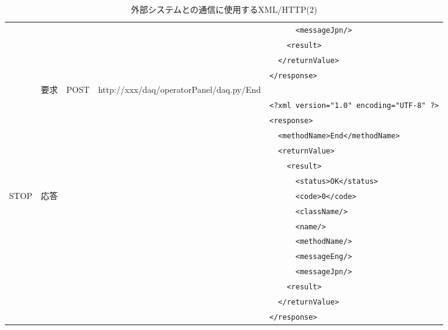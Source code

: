 \documentclass[a4j,10pt,dvips,onecolumn,oneside,final]{jarticle}%
\begin{document}
\begin{table}[htbp]
\begin{center}
{\begin{tabular}{|c|c|c|c|l|}
                  &           &      &                                            & \verb|      <messageJpn/>|\\ 
                  &           &      &                                            & \verb|    <result>|\\
                  &           &      &                                            & \verb|  </returnValue>|\\ 
                  &           &      &                                            & \verb|</response>|\\ \hline
                  & 要求      & POST & http://xxx/daq/operatorPanel/daq.py/End    & \\ \cline{2-5}
                  &           &      &                                            & \verb|<?xml version="1.0" encoding="UTF-8" ?>|\\
                  &           &      &                                            & \verb|<response>|\\ 
                  &           &      &                                            & \verb|  <methodName>End</methodName>|\\ 
                  &           &      &                                            & \verb|  <returnValue>|\\ 
                  &           &      &                                            & \verb|    <result>|\\ 
                  &           &      &                                            & \verb|      <status>OK</status>|\\ 
      STOP        & 応答      &      &                                            & \verb|      <code>0</code>|\\ 
                  &           &      &                                            & \verb|      <className/>|\\ 
                  &           &      &                                            & \verb|      <name/>|\\ 
                  &           &      &                                            & \verb|      <methodName/>|\\ 
                  &           &      &                                            & \verb|      <messageEng/>|\\ 
                  &           &      &                                            & \verb|      <messageJpn/>|\\ 
                  &           &      &                                            & \verb|    <result>|\\
                  &           &      &                                            & \verb|  </returnValue>|\\ 
                  &           &      &                                            & \verb|</response>|\\ \hline
    \end{tabular}
    \caption{外部システムとの通信に使用するXML/HTTP(2)}\label{http2.tab}
}
\end{center}
\end{table}
\end{document}
